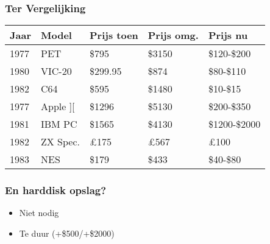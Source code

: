 \documentclass[aspectratio=43]{uva-inf-presentation}
\begin{document}

\begin{frame}
\frametitle{Ter Vergelijking}

\begin{tabular}{|l|l|l|l|l|}
\hline Jaar & Model & Prijs toen & Prijs omg. & Prijs nu \\ \hline
1977 & PET & \$795 & \$3150 & \$120-\$200 \\
1980 & VIC-20 & \$299.95 & \$874 & \$80-\$110 \\
1982 & C64 & \$595 & \$1480 & \$10-\$15 \\ \hline
1977 & Apple ][ & \$1296 & \$5130 & \$200-\$350 \\
1981 & IBM PC & \$1565 & \$4130 & \$1200-\$2000 \\
1982 & ZX Spec. & \pounds 175 & \pounds 567 & \pounds 100 \\ \hline
1983 & NES & \$179 & \$433 & \$40-\$80 \\ \hline
\end{tabular}


\end{frame}


\begin{frame}
\frametitle{En harddisk opslag?}

\begin{itemize}
\item Niet nodig
\item Te duur (+\$500/+\$2000)
\end{itemize}

\end{frame}
\end{document}
